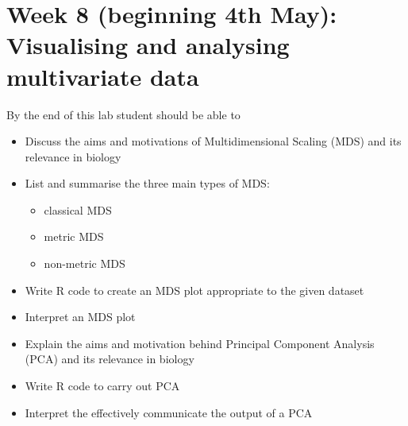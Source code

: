 \documentclass{article}
\begin{document}
\section*{Week 8 (beginning 4th May): Visualising and analysing multivariate data}
By the end of this lab student should be able to
\begin{itemize}
\item Discuss the aims and motivations of Multidimensional Scaling (MDS) and its relevance in biology
\item List and summarise the three main types of MDS:
  \begin{itemize}
  \item classical MDS
  \item metric MDS
  \item non-metric MDS
  \end{itemize}
\item Write R code to create an MDS plot appropriate to the given dataset
\item Interpret an MDS plot
\item Explain the aims and motivation behind Principal Component Analysis (PCA) and its relevance in biology 
\item Write R code to carry out PCA
  \item Interpret the effectively communicate the output of a PCA 
\end{itemize}
\end{document}
